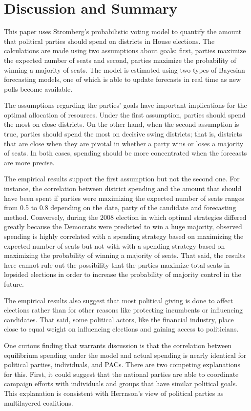 \documentclass[12pt,final,fleqn]{article}
\theoremstyle{plain}
\begin{document}
\section{Discussion and Summary}
This paper uses Stromberg's \citeyear{stromberg2008electoral} probabilistic voting model to quantify the amount that political parties should spend on districts in House elections. The calculations are made using two assumptions about goals: first, parties maximize the expected number of seats and second, parties maximize the probability of winning a majority of seats. The model is estimated using two types of Bayesian forecasting models, one of which is able to update forecasts in real time as new polls become available.

The assumptions regarding the parties' goals have important implications for the optimal allocation of resources. Under the first assumption, parties should spend the most on close districts. On the other hand, when the second assumption is true, parties should spend the most on decisive swing districts; that is, districts that are close when they are pivotal in whether a party wins or loses a majority of seats. In both cases, spending should be more concentrated when the forecasts are more precise. 

The empirical results support the first assumption but not the second one. For instance, the correlation between district spending and the amount that should have been spent if parties were maximizing the expected number of seats ranges from 0.5 to 0.8 depending on the date, party of the candidate and forecasting method. Conversely, during the 2008 election in which optimal strategies differed greatly because the Democrats were predicted to win a huge majority, observed spending is highly correlated with a spending strategy based on maximizing the expected number of seats but not with with a spending strategy based on maximizing the probability of winning a majority of seats. That said, the results here cannot rule out the possibility that the parties maximize total seats in lopsided elections in order to increase the probability of majority control in the future. 

The empirical results also suggest that most political giving is done to affect elections rather than for other reasons like protecting incumbents or influencing candidates. That said, some political actors, like the financial industry, place close to equal weight on influencing elections and gaining access to politicians.

One curious finding that warrants discussion is that the correlation between equilibrium spending under the model and actual spending is nearly identical for political parties, individuals, and PACs. There are two competing explanations for this. First, it could suggest that the national parties are able to coordinate campaign efforts with individuals and groups that have similar political goals. This explanation is consistent with Herrnson's \citeyear{herrnson2009roles} view of political parties as multilayered coalitions.
\end{document}
